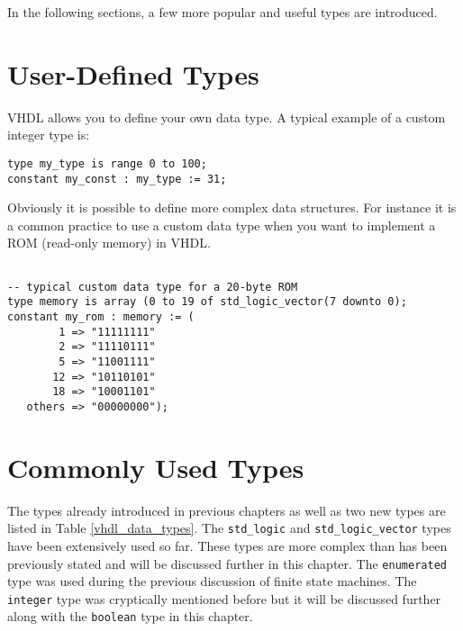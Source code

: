 In the following sections, a few more popular and useful types are introduced.

\section{User-Defined Types}
VHDL allows you to define your own data type. A typical example of a custom integer type is:

\noindent
\begin{minipage}{0.99\linewidth}
	\begin{lstlisting}
type my_type is range 0 to 100;
constant my_const : my_type := 31;
	\end{lstlisting}
\end{minipage}

\noindent
Obviously it is possible to define more complex data structures. For instance it is a common practice to use a custom data type when you want to implement a ROM (read-only memory) in VHDL.

\noindent
\begin{minipage}{0.99\linewidth}
\begin{lstlisting}

-- typical custom data type for a 20-byte ROM
type memory is array (0 to 19 of std_logic_vector(7 downto 0);
constant my_rom : memory := (
        1 => "11111111"
        2 => "11110111"
        5 => "11001111"
       12 => "10110101"
       18 => "10001101"
   others => "00000000");
\end{lstlisting}
\end{minipage}

\section{Commonly Used Types}
The types already introduced in previous chapters as well as two new types are listed in Table \ref{vhdl_data_types}. The \texttt{std\_logic} and \texttt{std\_logic\_vector} types have been extensively used so far. These types are more complex than has been previously stated and will be discussed further in this chapter. The \texttt{enumerated} type was used during the previous discussion of finite state machines. The \texttt{integer} type was cryptically mentioned before but it will be discussed further along with the \texttt{boolean} type in this chapter.

